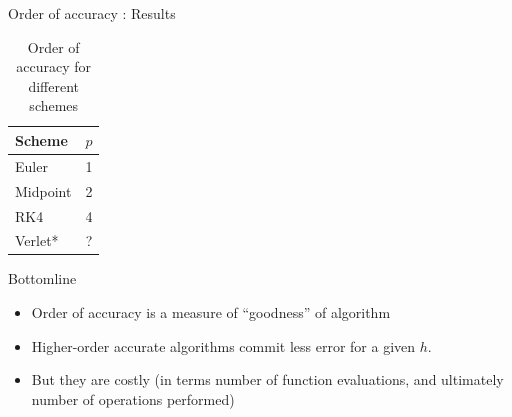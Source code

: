 \documentclass[presentation]{beamer}
\begin{document}
\begin{frame}[label={sec:org23b6dbb}]{Order of accuracy : Results}
\begin{table}[htbp]
\caption{\label{tab_sym_snake_params}
Order of accuracy for different schemes}
\centering
\begin{tabular}{lr}
\toprule
Scheme & \(p\)\\
\midrule
Euler & 1\\
Midpoint & 2\\
RK4 & 4\\
Verlet* & ?\\
\bottomrule
\end{tabular}
\end{table}
\end{frame}
\begin{frame}[label={sec:orga79de89}]{Bottomline}
\begin{itemize}
\item Order of accuracy is a measure of ``goodness'' of algorithm
\item Higher-order accurate algorithms commit less error for a given \(h\).
\item But they are costly (in terms number of function evaluations, and
ultimately number of operations performed)
\end{itemize}
\end{frame}
\end{document}
